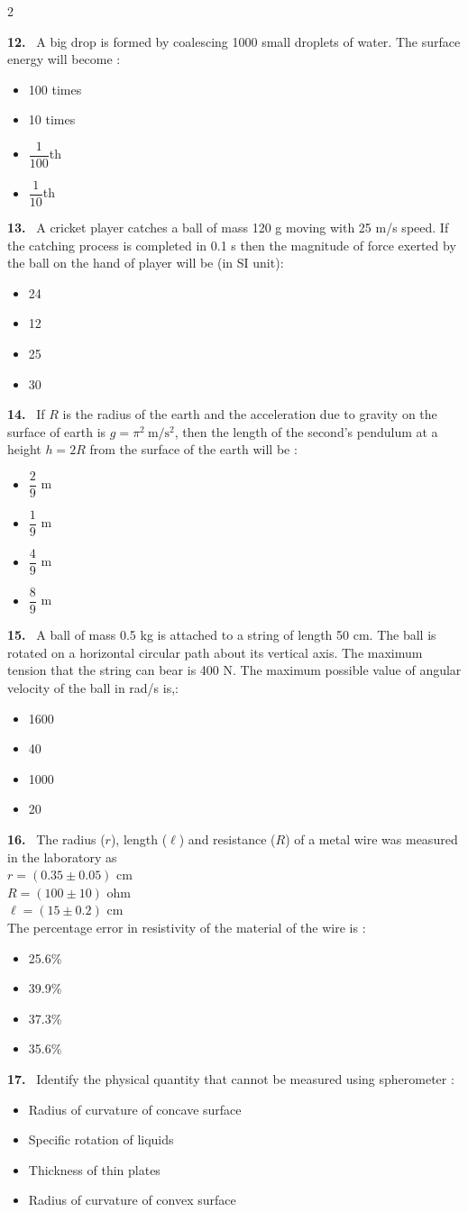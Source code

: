\documentclass[10pt]{extarticle}
\newcommand{\qn}[1]{\par\smallskip\noindent\textbf{#1.}~}
\newenvironment{qoptions}{\begin{itemize}[leftmargin=1.8em,itemsep=1pt,topsep=2pt,label={}]}{\end{itemize}}
\newcommand{\opt}[2]{\item[(#1)] #2}
\begin{document}
\begin{multicols}{2}
\qn{12} A big drop is formed by coalescing 1000 small droplets of water. The surface energy will become :
\begin{qoptions}
\opt{A}{100 times}
\opt{B}{10 times}
\opt{C}{$\dfrac1{100}$th}
\opt{D}{$\dfrac1{10}$th}
\end{qoptions}

\qn{13} A cricket player catches a ball of mass 120 g moving with 25 m/s speed. If the catching process is completed in 0.1 s then the magnitude of force exerted by the ball on the hand of player will be (in SI unit):
\begin{qoptions}
\opt{A}{24}
\opt{B}{12}
\opt{C}{25}
\opt{D}{30}
\end{qoptions}

\qn{14} If $R$ is the radius of the earth and the acceleration due to gravity on the surface of earth is $g=\pi^2\ \mathrm{m/s^2}$, then the length of the second's pendulum at a height $h=2R$ from the surface of the earth will be :
\begin{qoptions}
\opt{A}{$\dfrac29$ m}
\opt{B}{$\dfrac19$ m}
\opt{C}{$\dfrac49$ m}
\opt{D}{$\dfrac89$ m}
\end{qoptions}

\qn{15} A ball of mass 0.5 kg is attached to a string of length 50 cm. The ball is rotated on a horizontal circular path about its vertical axis. The maximum tension that the string can bear is 400 N. The maximum possible value of angular velocity of the ball in rad/s is,:
\begin{qoptions}
\opt{A}{1600}
\opt{B}{40}
\opt{C}{1000}
\opt{D}{20}
\end{qoptions}

\qn{16} The radius ($r$), length ($\ell$) and resistance ($R$) of a metal wire was measured in the laboratory as\\
$r=(0.35\pm0.05)$ cm\\
$R=(100\pm10)$ ohm\\
$\ell=(15\pm0.2)$ cm\\
The percentage error in resistivity of the material of the wire is :
\begin{qoptions}
\opt{A}{25.6\%}
\opt{B}{39.9\%}
\opt{C}{37.3\%}
\opt{D}{35.6\%}
\end{qoptions}

\qn{17} Identify the physical quantity that cannot be measured using spherometer :
\begin{qoptions}
\opt{A}{Radius of curvature of concave surface}
\opt{B}{Specific rotation of liquids}
\opt{C}{Thickness of thin plates}
\opt{D}{Radius of curvature of convex surface}
\end{qoptions}


\end{multicols}
\end{document}
